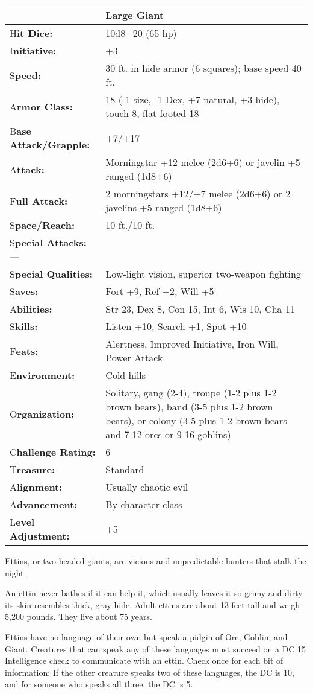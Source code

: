 \documentclass{article}
\begin{document}
\begin{tabular}{|>{\raggedright}p{85pt}|>{\raggedright}p{240pt}|}
\hline
  & Large Giant\tabularnewline
\hline
H\textbf{it Dice:} & 10d8+20 (65 hp)\tabularnewline
\hline
I\textbf{nitiative:} & +3\tabularnewline
\hline
S\textbf{peed:} & 30 ft. in hide armor (6 squares); base speed 40 ft.\tabularnewline
\hline
A\textbf{rmor Class:} & 18 (-1 size, -1 Dex, +7 natural, +3 hide), touch 8, flat-footed 
18\tabularnewline
\hline
B\textbf{ase Attack/Grapple:} & +7/+17\tabularnewline
\hline
A\textbf{ttack:} & Morningstar +12 melee (2d6+6) or javelin +5 ranged (1d8+6)\tabularnewline
\hline
F\textbf{ull Attack:} & 2 morningstars +12/+7 melee (2d6+6) or 2 javelins +5 ranged 
(1d8+6)\tabularnewline
\hline
S\textbf{pace/Reach:} & 10 ft./10 ft.\tabularnewline
\hline
S\textbf{pecial Attacks:}--- & \tabularnewline
\hline
S\textbf{pecial Qualities:} & Low-light vision, superior two-weapon fighting\tabularnewline
\hline
S\textbf{aves:} & Fort +9, Ref +2, Will +5\tabularnewline
\hline
A\textbf{bilities:} & Str 23, Dex 8, Con 15, Int 6, Wis 10, Cha 11\tabularnewline
\hline
S\textbf{kills:} & Listen +10, Search +1, Spot +10\tabularnewline
\hline
F\textbf{eats:} & Alertness, Improved Initiative, Iron Will, Power Attack\tabularnewline
\hline
E\textbf{nvironment:} & Cold hills\tabularnewline
\hline
O\textbf{rganization:} & Solitary, gang (2-4), troupe (1-2 plus 1-2 brown bears), 
band (3-5 plus 1-2 brown bears), or colony (3-5 plus 1-2 brown bears and 7-12 orcs 
or 9-16 goblins)\tabularnewline
\hline
C\textbf{hallenge Rating:} & 6\tabularnewline
\hline
T\textbf{reasure:} & Standard\tabularnewline
\hline
A\textbf{lignment:} & Usually chaotic evil\tabularnewline
\hline
A\textbf{dvancement:} & By character class\tabularnewline
\hline
L\textbf{evel Adjustment:} & +5\tabularnewline
\hline
\end{tabular}

Ettins, or two-headed giants, are vicious and unpredictable hunters that stalk 
the night.

An ettin never bathes if it can help it, which usually leaves it so grimy and dirty 
its skin resembles thick, gray hide. Adult ettins are about 13 feet tall and weigh 
5,200 pounds. They live about 75 years.

Ettins have no language of their own but speak a pidgin of Orc, Goblin, and Giant. 
Creatures that can speak any of these languages must succeed on a DC 15 Intelligence 
check to communicate with an ettin. Check once for each bit of information: If 
the other creature speaks two of these languages, the DC is 10, and for someone 
who speaks all three, the DC is 5. 
\end{document}
